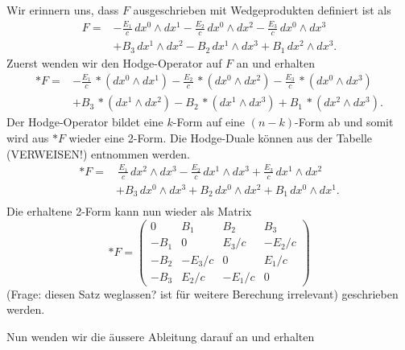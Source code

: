 
Wir erinnern uns, dass $F$ ausgeschrieben mit Wedgeprodukten definiert ist als
\begin{align*}
	F = 
	& - \frac{E_{1}}{c} \, dx^0 \wedge dx^1 - \frac{E_{2}}{c} \, dx^0 \wedge dx^2 - \frac{E_{3}}{c} \, dx^0 \wedge dx^3 \\
	& + B_3 \, dx^1 \wedge dx^2 - B_2 \, dx^1 \wedge dx^3 + B_1 \, dx^2 \wedge dx^3.
\end{align*}
Zuerst wenden wir den Hodge-Operator auf $F$ an und erhalten
\begin{align*}
	\ast F =
	& - \frac{E_{1}}{c} \, \ast(dx^0 \wedge dx^1) - \frac{E_{2}}{c} \, \ast(dx^0 \wedge dx^2) - \frac{E_{3}}{c} \, \ast(dx^0 \wedge dx^3) \\
	& + B_3 \, \ast(dx^1 \wedge dx^2) - B_2 \, \ast(dx^1 \wedge dx^3) + B_1 \, \ast(dx^2 \wedge dx^3).
\end{align*}
Der Hodge-Operator bildet eine $k$-Form auf eine $(n-k)$-Form ab und somit wird aus $\ast F$ wieder eine 2-Form.
Die Hodge-Duale können aus der Tabelle (VERWEISEN!) entnommen werden.
\begin{align*}
	\ast F =
	& \, \frac{E_{1}}{c} \, dx^2 \wedge dx^3 - \frac{E_{2}}{c} \, dx^1 \wedge dx^3 + \frac{E_{3}}{c} \, dx^1 \wedge dx^2 \\
	& + B_3 \, dx^0 \wedge dx^3 + B_2 \, dx^0 \wedge dx^2 + B_1 \, dx^0 \wedge dx^1.\\
\end{align*}
Die erhaltene 2-Form kann nun wieder als Matrix
\begin{equation}
	\ast F = \begin{pmatrix}
		0 & B_1 & B_2 & B_3 \\ -B_1 & 0 & E_3/c & -E_2/c \\ -B_2 & -E_3/c & 0 & E_1/c \\ -B_3 & E_2/c & -E_1/c & 0 
	\end{pmatrix}
\end{equation}
(Frage: diesen Satz weglassen? ist für weitere Berechung irrelevant) geschrieben werden.

Nun wenden wir die äussere Ableitung darauf an und erhalten

